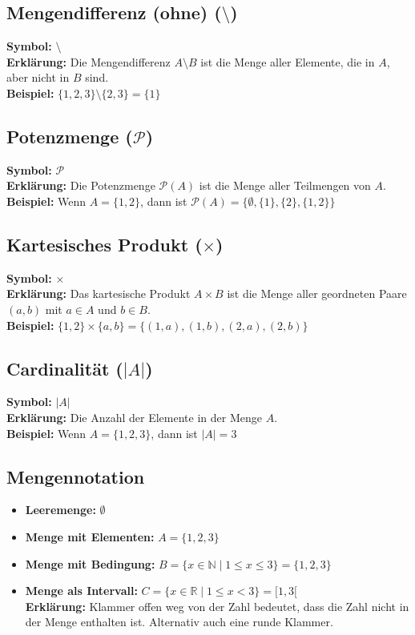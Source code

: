\documentclass[12pt,a4paper]{article}
\begin{document}
\subsection{Mengendifferenz (ohne) (\texorpdfstring{$\setminus$}{setminus})}
\textbf{Symbol:} $\setminus$ \\
\textbf{Erklärung:} Die Mengendifferenz $A \setminus B$ ist die Menge aller Elemente, die in $A$, aber nicht in $B$ sind. \\
\textbf{Beispiel:} $\{1,2,3\} \setminus \{2,3\} = \{1\}$

\subsection{Potenzmenge (\texorpdfstring{$\mathcal{P}$}{P})}
\textbf{Symbol:} $\mathcal{P}$ \\
\textbf{Erklärung:} Die Potenzmenge $\mathcal{P}(A)$ ist die Menge aller Teilmengen von $A$. \\
\textbf{Beispiel:} Wenn $A = \{1,2\}$, dann ist $\mathcal{P}(A) = \{\emptyset, \{1\}, \{2\}, \{1,2\}\}$

\subsection{Kartesisches Produkt (\texorpdfstring{$\times$}{times})}
\textbf{Symbol:} $\times$ \\
\textbf{Erklärung:} Das kartesische Produkt $A \times B$ ist die Menge aller geordneten Paare $(a,b)$ mit $a \in A$ und $b \in B$. \\
\textbf{Beispiel:} $\{1,2\} \times \{a,b\} = \{(1,a),(1,b),(2,a),(2,b)\}$

\subsection{Cardinalität (\texorpdfstring{$|A|$}{|A|})}
\textbf{Symbol:} $|A|$ \\
\textbf{Erklärung:} Die Anzahl der Elemente in der Menge $A$. \\
\textbf{Beispiel:} Wenn $A = \{1,2,3\}$, dann ist $|A| = 3$

\subsection{Mengennotation}
\begin{itemize}
    \item \textbf{Leeremenge: }$\emptyset$
    \item \textbf{Menge mit Elementen:} $A = \{1,2,3\}$
    \item \textbf{Menge mit Bedingung:} $B = \{x \in \mathbb{N} \mid 1 \leq x \leq 3\} = \{1,2,3\}$
    \item \textbf{Menge als Intervall:} $C = \{x \in \mathbb{R} \mid 1 \leq x < 3\} = [1, 3[$ \\ \textbf{Erklärung:} Klammer offen weg von der Zahl bedeutet, dass die Zahl nicht in der Menge enthalten ist. Alternativ auch eine runde Klammer.
\end{itemize}
\end{document}
